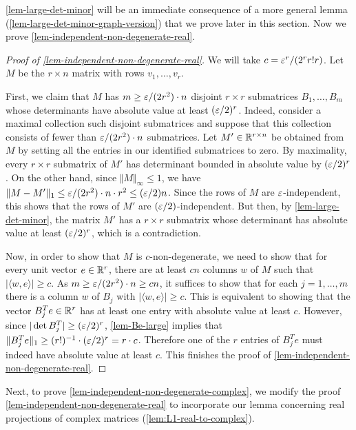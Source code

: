 \documentclass{daj}
\theoremstyle{plain}
\theoremstyle{plain}
\theoremstyle{plain}
\theoremstyle{plain}
\theoremstyle{definition}
\theoremstyle{plain}
\theoremstyle{plain}
\theoremstyle{definition}
\theoremstyle{definition}
\theoremstyle{plain}
\begin{document}
\cref{lem-large-det-minor} will be an immediate consequence of a more general lemma (\cref{lem-large-det-minor-graph-version}) that we prove later in this section. Now we prove \cref{lem-independent-non-degenerate-real}.

\begin{proof}[Proof of \cref{lem-independent-non-degenerate-real}]
We will take $c=\varepsilon^r/(2^r r!r)$. Let $M$ be the $r\times n$ matrix with rows $v_1,\dots,v_r$.

First, we claim that $M$ has $m\geq \varepsilon/(2r^2)\cdot n$ disjoint $r\times r$ submatrices $B_1,\dots,B_m$ whose determinants have absolute value at least $(\varepsilon/2)^r$. Indeed, consider a maximal collection such disjoint submatrices and suppose that this collection consists of fewer than $\varepsilon/(2r^2)\cdot n$ submatrices. Let $M'\in \mathbb{R}^{r\times n}$ be obtained from $M$ by setting all the entries in our identified submatrices to zero. By maximality, every $r\times r$ submatrix of $M'$ has determinant bounded in absolute value by $(\varepsilon/2)^r$. On the other hand, since $\Vert M\Vert_\infty\le 1$, we have $\Vert M-M'\Vert_1\leq \varepsilon/(2r^2)\cdot n\cdot r^2\leq (\varepsilon/2) n$. Since the rows of $M$ are $\varepsilon$-independent, this shows that the rows of $M'$ are $(\varepsilon/2)$-independent. But then, by \cref{lem-large-det-minor}, the matrix $M'$ has a $r\times r$ submatrix whose determinant has absolute value at least $(\varepsilon/2)^r$, which is a contradiction.

Now, in order to show that $M$ is $c$-non-degenerate, we need to show that for every unit vector $e\in \mathbb{R}^r$, there are at least $c n$ columns $w$ of $M$ such that $\vert \langle w,e\rangle \vert\geq c$. As $m\geq \varepsilon/(2r^2)\cdot n\geq cn$, it suffices to show that for each $j=1,\dots,m$ there is a column $w$ of $B_j$ with $\vert\langle w,e\rangle\vert\geq c$. This is equivalent to showing that the vector $B_j^{T} e\in \mathbb{R}^r$ has at least one entry with absolute value at least $c$. However, since $\vert \det B_j^T\vert\geq (\varepsilon/2)^r$, \cref{lem-Be-large} implies that $\Vert B_j^{T} e\Vert_1\geq (r!)^{-1}\cdot (\varepsilon/2)^r= r\cdot c$. Therefore one of the $r$ entries of $B_j^{T} e$ must indeed have absolute value at least $c$. This finishes the proof of \cref{lem-independent-non-degenerate-real}.
\end{proof}

Next, to prove \cref{lem-independent-non-degenerate-complex}, we modify the proof \cref{lem-independent-non-degenerate-real} to incorporate our lemma concerning real projections of complex matrices (\cref{lem:L1-real-to-complex}).
\end{document}

